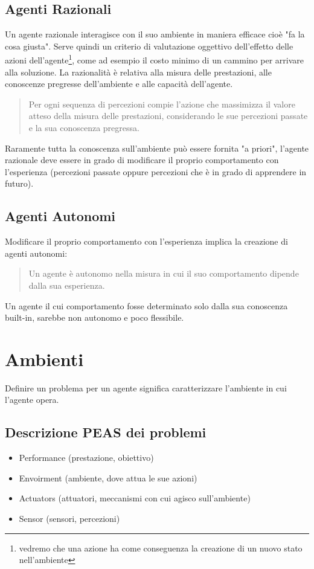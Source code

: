 \documentclass{article}
\begin{document}
\subsection{Agenti Razionali}
Un agente razionale interagisce con il suo ambiente in maniera efficace cioè "fa la cosa giusta". Serve quindi un criterio di valutazione oggettivo dell'effetto delle azioni dell'agente\footnote{vedremo che una azione ha come conseguenza la creazione di un nuovo stato nell'ambiente}, come ad esempio il costo minimo di un cammino per arrivare alla soluzione. La razionalità è relativa alla misura delle prestazioni, alle conoscenze pregresse dell'ambiente e alle capacità dell'agente.
\begin{quote}
    Per ogni sequenza di percezioni compie l'azione che massimizza il valore atteso della misura delle prestazioni, considerando le sue percezioni passate e la sua conoscenza pregressa.
\end{quote}
Raramente tutta la conoscenza sull'ambiente può essere fornita "a priori", l'agente razionale deve essere in grado di modificare il proprio comportamento con l'esperienza (percezioni passate oppure percezioni che è in grado di apprendere in futuro).

\subsection{Agenti Autonomi}
Modificare il proprio comportamento con l'esperienza implica la creazione di agenti autonomi:
\begin{quote}
    Un agente è autonomo nella misura in cui il suo comportamento dipende dalla sua esperienza. 
\end{quote}
Un agente il cui comportamento fosse determinato solo dalla sua conoscenza built-in, sarebbe non autonomo e poco flessibile.

\section{Ambienti}
Definire un problema per un agente significa caratterizzare l'ambiente in cui l'agente opera.

\subsection{Descrizione PEAS dei problemi}
\begin{itemize}
    \item Performance (prestazione, obiettivo)
    \item Envoirment (ambiente, dove attua le sue azioni)
    \item Actuators (attuatori, meccanismi con cui agisco sull'ambiente)
    \item Sensor (sensori, percezioni)
\end{itemize}
\clearpage
\end{document}
